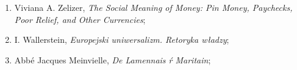 \documentclass[a4paper,11pt]{article}
\begin{document}
\begin{enumerate}
\item Viviana A. Zelizer, \textit{The Social Meaning of Money: Pin
    Money, Paychecks, Poor Relief, and Other Currencies};








\item I. Wallerstein, \textit{Europejski uniwersalizm. Retoryka władzy};

\item Abbé Jacques Meinvielle, \textit{De Lamennais ŕ Maritain};






















































\end{enumerate}
\end{document}
